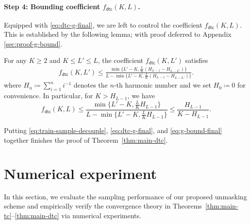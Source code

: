 \documentclass[english]{article}
\newcommand{\defn}{\coloneqq}
\newcommand{\dtc}{\mathsf{dtc}}
\begin{document}
\paragraph{Step 4: Bounding coefficient $ f_\dtc(K, L) $.}

Equipped with \eqref{eq:dtc-g-final}, we are left to control the coefficient $ f_\dtc(K, L) $. This is established by the following lemma; with proof deferred to Appendix \ref{sec:proof-g-bound}.
\begin{lemma} \label{lem:g-bound}
    For any $K \geq 2$ and $K\leq L' \leq L$, the coefficient $ f_\dtc(K, L') $ satisfies
    \begin{align}
    f_\dtc(K, L') \leq \frac{\min\{L'-K, \frac{L}{K}(H_{L-1} - H_{L-L'} )\}}{L - \min\{L'-K, \frac{L}{K}(H_{L-1} - H_{L-L'} )\}}.\label{eq:g-bound}
    \end{align}
    where $H_n \defn \sum_{i=1}^{n} i^{-1}$ denotes the $n$-th harmonic number and we set $H_0 \defn 0$ for convenience.
    In particular, for $K > H_{L-1}$, we have
    \begin{equation}
        \label{eq:g-bound-final}
        f_\dtc(K, L) \leq \frac{\min\{L'-K, \frac{L}{K}H_{L-1}\}}{L - \min\{L'-K, \frac{L}{K}H_{L-1}\}} \leq \frac{H_{L-1}}{K - H_{L-1}}.
    \end{equation}
\end{lemma}

Putting \eqref{eq:train-sample-decouple}, \eqref{eq:dtc-g-final}, and \eqref{eq:g-bound-final} together finishes the proof of Theorem~\ref{thm:main-dtc}.








\section{Numerical experiment}
\label{sec:experiment}
In this section, we evaluate the sampling performance of our proposed unmasking scheme and empirically verify the convergence theory in Theorems~\ref{thm:main-tc}--\ref{thm:main-dtc} via numerical experiments.
\end{document}
